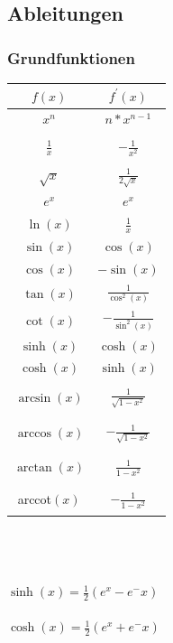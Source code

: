 \documentclass[12pt,a4paper]{article}
\begin{document}
	\subsection{Ableitungen}
		\subsubsection{Grundfunktionen}
			\begin{tabular}{c|c}
				 \hline
				$f(x)$ & $f^{'}(x)$ \\
				\hline
				$x^{n}$ & $n*x^{n-1}$ \\
				\hline\\
				$\frac{1}{x}$ & $- \frac{1}{x^2}$ \\\\
				\hline
				$\sqrt{x}$ & $\frac{1}{2\sqrt{x}}$\\
				\hline
				$e^{x}$ & $e^{x}$ \\
				\hline
				$\ln(x)$ & $\frac{1}{x}$ \\
				\hline
				$\sin{(x)}$ & $\cos{(x)}$ \\
				\hline
				$\cos{(x)}$ & $-\sin{(x)}$ \\
				\hline 
				$\tan{(x)}$ & $\frac{1}{\cos^2(x)}$\\
				\hline 
				$\cot{(x)}$ & $-\frac{1}{\sin^2(x)}$\\
				\hline
				$\sinh{(x)}$ & $\cosh{(x)}$ \\
				\hline
				$\cosh{(x)}$ & $\sinh{(x)}$ \\
				\hline\\
				$\arcsin(x)$ & $\frac{1}{\sqrt{1-x^2}}$\\\\
				\hline\\
				$\arccos(x)$ & $-\frac{1}{\sqrt{1-x^2}}$\\\\
				\hline\\
				$\arctan(x)$ & $\frac{1}{1-x^2}$\\\\
				\hline\\
				arccot$(x)$ & $-\frac{1}{1-x^2}$\\\\
			\end{tabular}\\\\\\
			$\sinh{(x)} = \frac{1}{2}(e^x-e^-x)$ \\\\
			$\cosh{(x)} = \frac{1}{2}(e^x+e^-x)$ 
\end{document}
